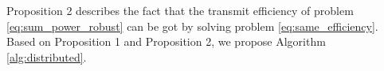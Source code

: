 \documentclass[journal]{IEEEtran}
\begin{document}
%
%


Proposition 2 describes the fact that the transmit efficiency of problem \eqref{eq:sum_power_robust} can be got by solving problem \eqref{eq:same_efficiency}.  Based on Proposition 1 and Proposition 2, we propose Algorithm \ref{alg:distributed}.
\end{document}
